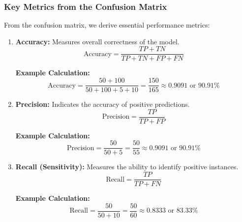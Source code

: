 \documentclass[aspectratio=169]{beamer}
\begin{document}
\begin{frame}[fragile]
    \frametitle{Key Metrics from the Confusion Matrix}
    From the confusion matrix, we derive essential performance metrics:
    
    \begin{enumerate}
        \item \textbf{Accuracy:} Measures overall correctness of the model.
        \begin{equation}
            \text{Accuracy} = \frac{TP + TN}{TP + TN + FP + FN}
        \end{equation}
        
        \textbf{Example Calculation:}
        \begin{equation}
            \text{Accuracy} = \frac{50 + 100}{50 + 100 + 5 + 10} = \frac{150}{165} \approx 0.9091 \text{ or } 90.91\%
        \end{equation}

        \item \textbf{Precision:} Indicates the accuracy of positive predictions.
        \begin{equation}
            \text{Precision} = \frac{TP}{TP + FP}
        \end{equation}
        
        \textbf{Example Calculation:}
        \begin{equation}
            \text{Precision} = \frac{50}{50 + 5} = \frac{50}{55} \approx 0.9091 \text{ or } 90.91\%
        \end{equation}

        \item \textbf{Recall (Sensitivity):} Measures the ability to identify positive instances.
        \begin{equation}
            \text{Recall} = \frac{TP}{TP + FN}
        \end{equation}
        
        \textbf{Example Calculation:}
        \begin{equation}
            \text{Recall} = \frac{50}{50 + 10} = \frac{50}{60} \approx 0.8333 \text{ or } 83.33\%
        \end{equation}
    \end{enumerate}
\end{frame}
\end{document}
